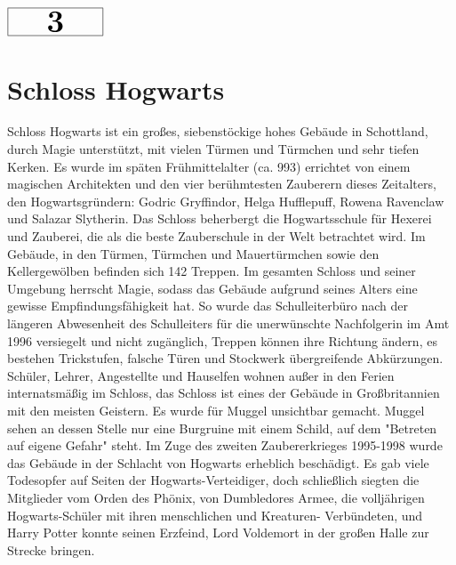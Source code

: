 \documentclass[a4paper, 10pt]{article}
\begin{document}
\begin{minipage}[t]{\textwidth}
    \vspace*{-1.5cm} %
    \begin{flushright}
        \hspace*{\fill} %
        $\boxed{\textbf{\Huge\phantom{00}3\phantom{00}}}$ %
    \end{flushright}
\end{minipage}

\section*{\huge Schloss Hogwarts}
Schloss Hogwarts ist ein großes, siebenstöckige hohes Gebäude in Schottland, durch Magie unterstützt, mit vielen Türmen und Türmchen und sehr tiefen Kerken. Es wurde im späten Frühmittelalter (ca. 993) errichtet von einem magischen Architekten und den vier berühmtesten Zauberern dieses Zeitalters, den Hogwartsgründern: Godric Gryffindor, Helga Hufflepuff, Rowena Ravenclaw und Salazar Slytherin. Das Schloss beherbergt die Hogwartsschule für Hexerei und Zauberei, die als die beste Zauberschule in der Welt betrachtet wird.
\vspace{10pt}
\newline
Im Gebäude, in den Türmen, Türmchen und Mauertürmchen sowie den Kellergewölben befinden sich 142 Treppen. Im gesamten Schloss und seiner Umgebung herrscht Magie, sodass das Gebäude aufgrund seines Alters eine gewisse Empfindungsfähigkeit hat. So wurde das Schulleiterbüro nach der längeren Abwesenheit des Schulleiters für die unerwünschte Nachfolgerin im Amt 1996 versiegelt und nicht zugänglich, Treppen können ihre Richtung ändern, es bestehen Trickstufen, falsche Türen und Stockwerk übergreifende Abkürzungen.
\vspace{10pt}
\newline
Schüler, Lehrer, Angestellte und Hauselfen wohnen außer in den Ferien internatsmäßig im Schloss, das Schloss ist eines der Gebäude in Großbritannien mit den meisten Geistern.
\vspace{10pt}
\newline
Es wurde für Muggel unsichtbar gemacht. Muggel sehen an dessen Stelle nur eine Burgruine mit einem Schild, auf dem "Betreten auf eigene Gefahr" steht.
\vspace{10pt}
\newline
Im Zuge des zweiten Zaubererkrieges 1995-1998 wurde das Gebäude in der Schlacht von Hogwarts erheblich beschädigt. Es gab viele Todesopfer auf Seiten der Hogwarts-Verteidiger, doch schließlich siegten die Mitglieder vom Orden des Phönix, von Dumbledores Armee, die volljährigen Hogwarts-Schüler mit ihren menschlichen und Kreaturen- Verbündeten, und Harry Potter konnte seinen Erzfeind, Lord Voldemort in der großen Halle zur Strecke bringen.
\end{document}
